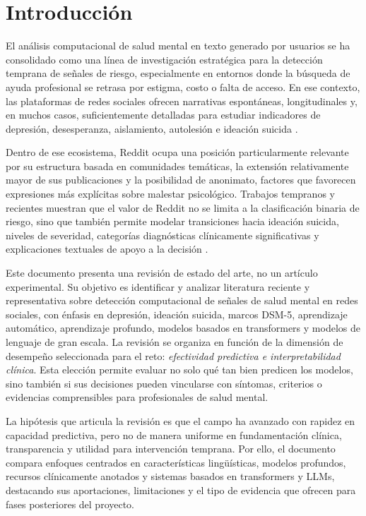 \section{Introducción}

El análisis computacional de salud mental en texto generado por usuarios se ha consolidado como una línea de investigación estratégica para la detección temprana de señales de riesgo, especialmente en entornos donde la búsqueda de ayuda profesional se retrasa por estigma, costo o falta de acceso. En ese contexto, las plataformas de redes sociales ofrecen narrativas espontáneas, longitudinales y, en muchos casos, suficientemente detalladas para estudiar indicadores de depresión, desesperanza, aislamiento, autolesión e ideación suicida \citep{montejo2024survey, abdulsalam2024suicidal}.

Dentro de ese ecosistema, Reddit ocupa una posición particularmente relevante por su estructura basada en comunidades temáticas, la extensión relativamente mayor de sus publicaciones y la posibilidad de anonimato, factores que favorecen expresiones más explícitas sobre malestar psicológico. Trabajos tempranos y recientes muestran que el valor de Reddit no se limita a la clasificación binaria de riesgo, sino que también permite modelar transiciones hacia ideación suicida, niveles de severidad, categorías diagnósticas clínicamente significativas y explicaciones textuales de apoyo a la decisión \citep{dechoudhury2016shifts, gaur2019severity, bao2025redsm5}.

Este documento presenta una revisión de estado del arte, no un artículo experimental. Su objetivo es identificar y analizar literatura reciente y representativa sobre detección computacional de señales de salud mental en redes sociales, con énfasis en depresión, ideación suicida, marcos DSM-5, aprendizaje automático, aprendizaje profundo, modelos basados en transformers y modelos de lenguaje de gran escala. La revisión se organiza en función de la dimensión de desempeño seleccionada para el reto: \textit{efectividad predictiva e interpretabilidad clínica}. Esta elección permite evaluar no solo qué tan bien predicen los modelos, sino también si sus decisiones pueden vincularse con síntomas, criterios o evidencias comprensibles para profesionales de salud mental.

La hipótesis que articula la revisión es que el campo ha avanzado con rapidez en capacidad predictiva, pero no de manera uniforme en fundamentación clínica, transparencia y utilidad para intervención temprana. Por ello, el documento compara enfoques centrados en características lingüísticas, modelos profundos, recursos clínicamente anotados y sistemas basados en transformers y LLMs, destacando sus aportaciones, limitaciones y el tipo de evidencia que ofrecen para fases posteriores del proyecto.
